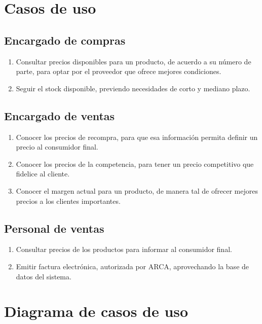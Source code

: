 
\section{Casos de uso}

\subsection*{Encargado de compras}
\begin{enumerate}
	\item Consultar precios disponibles para un producto, 
	de acuerdo a su número de parte, 
	para optar por el proveedor que ofrece mejores condiciones.
	\item Seguir el stock disponible,
	previendo necesidades de corto y mediano plazo.
\end{enumerate}

\subsection*{Encargado de ventas}
\begin{enumerate}
	\item Conocer los precios de recompra,
	para que esa información permita definir un precio al consumidor final.
	\item Conocer los precios de la competencia,
	para tener un precio competitivo que fidelice al cliente.
	\item Conocer el margen actual para un producto,
	de manera tal de ofrecer mejores precios a los clientes importantes.
\end{enumerate}

\subsection*{Personal de ventas}
\begin{enumerate}
	\item Consultar precios de los productos para informar al consumidor final.
	\item Emitir factura electrónica,
	autorizada por ARCA, aprovechando la base de datos del sistema.
\end{enumerate}

\section{Diagrama de casos de uso}


